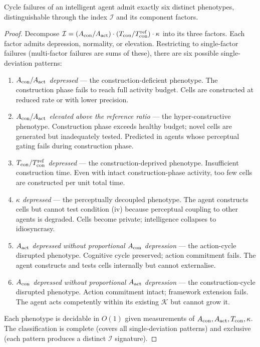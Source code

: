 \documentclass[11pt,twocolumn,a4paper]{article}
\newcommand{\K}{\mathcal{K}}
\newcommand{\Iindex}{\mathcal{I}}
\newcommand{\Acon}{A_{\rm con}}
\newcommand{\Aact}{A_{\rm act}}
\newcommand{\Tcon}{T_{\rm con}}
\begin{document}
\begin{theorem}\label{thm:t7}
Cycle failures of an intelligent agent admit exactly six distinct phenotypes,
distinguishable through the index $\Iindex$ and its component factors.
\end{theorem}

\begin{proof}
Decompose $\Iindex = (\Acon / \Aact) \cdot (\Tcon / \Tcon^{\rm ref}) \cdot \kappa$ into
its three factors. Each factor admits depression, normality, or elevation. Restricting to
single-factor failures (multi-factor failures are sums of these), there are six possible
single-deviation patterns:

\begin{enumerate}[label=\textbf{(P\arabic*)},leftmargin=*]
\item \emph{$\Acon / \Aact$ depressed} --- the construction-deficient phenotype. The
construction phase fails to reach full activity budget. Cells are constructed at reduced
rate or with lower precision.

\item \emph{$\Acon / \Aact$ elevated above the reference ratio} --- the
hyper-constructive phenotype. Construction phase exceeds healthy budget; novel cells
are generated but inadequately tested. Predicted in agents whose perceptual gating fails
during construction phase.

\item \emph{$\Tcon / \Tcon^{\rm ref}$ depressed} --- the construction-deprived phenotype.
Insufficient construction time. Even with intact construction-phase activity, too few
cells are constructed per unit total time.

\item \emph{$\kappa$ depressed} --- the perceptually decoupled phenotype. The agent
constructs cells but cannot test condition (iv) because perceptual coupling to other
agents is degraded. Cells become private; intelligence collapses to idiosyncrasy.

\item \emph{$\Aact$ depressed without proportional $\Acon$ depression} --- the
action-cycle disrupted phenotype. Cognitive cycle preserved; action commitment fails.
The agent constructs and tests cells internally but cannot externalise.

\item \emph{$\Acon$ depressed without proportional $\Aact$ depression} --- the
construction-cycle disrupted phenotype. Action commitment intact; framework extension
fails. The agent acts competently within its existing $\K$ but cannot grow it.
\end{enumerate}

Each phenotype is decidable in $O(1)$ given measurements of $\Acon, \Aact, \Tcon, \kappa$.
The classification is complete (covers all single-deviation patterns) and exclusive
(each pattern produces a distinct $\Iindex$ signature).
\end{proof}
\end{document}
